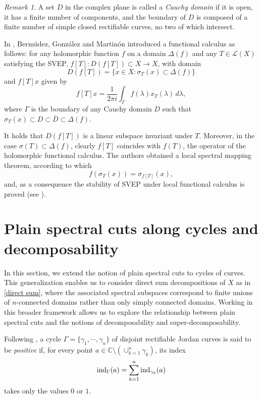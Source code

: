 \documentclass[11pt]{amsart}
\theoremstyle{definition}
\theoremstyle{remark}
\newtheorem{remark}[theorem]{Remark}
\numberwithin{equation}{section}
\newcommand{\EL}{\mathcal{L}}
\newcommand{\C}{\mathbb{C}}
\newcommand{\ind}{\textnormal{ind}}
\begin{document}
\begin{remark}
A set $D$ in the complex plane is called a \emph{Cauchy domain} if it is open, it has a finite number of components, and the boundary of $D$ is composed of
a finite number of simple closed rectifiable curves, no two of which intersect.

In \cite{Bermudez1997}, Berm{\'u}dez, Gonz{\'a}lez and Martin{\'o}n  introduced a functional calculus as follows: for any holomorphic
function $f$ on a domain $\Delta(f)$ and any $T\in \EL(X)$ satisfying the
SVEP, $f[T]:D(f[T])\subset X\to X$, with domain
$$
D(f[T])= \{x\in X : \sigma_T(x)\subset \Delta(f)\}
$$
and $f[T]x$ given by
$$
f[T]x=\frac{1}{2\pi i}\int_{\Gamma} f(\lambda)x_T(\lambda)\,d\lambda,
$$
where $\Gamma$ is the boundary of any Cauchy domain $D$ such that
$\sigma_T(x)\subset D\subset \overline{D}\subset \Delta(f)$.

It holds that $D(f[T])$ is a linear subspace invariant under $T$. Moreover, in the case $\sigma(T)\subset \Delta(f)$, clearly $f[T]$
coincides with $f(T)$, the operator of the holomorphic functional calculus. The authors obtained a local spectral mapping theorem, according to which
$$
f(\sigma_T(x)) = \sigma_{f[T]}(x),
$$
and, as a consequence the stability of SVEP under local functional calculus is proved (see \cite{BermudezGonzalezMartinon2002}).
\end{remark}


\section{Plain spectral cuts along cycles and decomposability}\label{sec 3}

In this section, we extend the notion of plain spectral cuts to cycles of curves. This generalization enables us to consider direct sum decompositions of $X$ as in \eqref{direct sum}, where the associated spectral subspaces correspond to finite unions of $n$-connected  domains rather than only simply connected domains. Working in this broader framework allows us to explore the relationship between plain spectral cuts and the notions of decomposability and super-decomposability.

Following \cite[Chapter 13]{Conway2}, a cycle $\Gamma=\{\gamma_1,\cdots,\gamma_n\}$ of disjoint rectifiable Jordan curves is said to be \textit{positive} if, for every point $a\in \C \setminus \left(\cup_{k=1}^n \gamma_k\right)$, its index
$$
\ind_\Gamma(a)= \sum_{k=1}^n \ind_{\gamma_k}(a)
$$
takes only the values $0$ or $1$.
\end{document}
